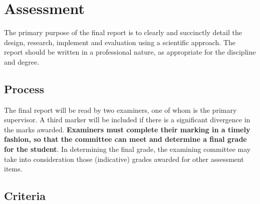 \section{Assessment}
The primary purpose of the final report is to clearly and succinctly
detail the design, research, implement and evaluation using a scientific approach.  
The report should be written in a professional nature, as
appropriate for the discipline and degree.

\subsection{Process}
The final report will be read by two examiners,
one of whom is the primary supervisor.  A third marker will be included 
if there is a significant divergence in the marks awarded.  {\bf
  Examiners must complete their marking in a timely fashion, so that
  the committee can meet and determine a final grade for the student}.
In determining the final grade, the examining committee may take into
consideration those (indicative) grades awarded for other assessment
items.

\subsection{Criteria}

